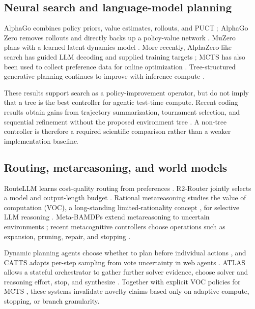 \documentclass[10pt,twocolumn]{article}
\begin{document}
\subsection{Neural search and language-model planning}

AlphaGo combines policy priors, value estimates, rollouts, and PUCT
\citep{silver2016alphago}; AlphaGo Zero removes rollouts and directly backs up a
policy-value network \citep{silver2017zero}. MuZero plans with a learned latent
dynamics model \citep{schrittwieser2020muzero}. More recently, AlphaZero-like
search has guided LLM decoding and supplied training targets
\citep{feng2024tsllm}; MCTS has also been used to collect preference data for
online optimization \citep{xu2025mctsep}. Tree-structured generative planning
continues to improve with inference compute \citep{yoon2025mctd}.

These results support search as a policy-improvement operator, but do not imply
that a tree is the best controller for agentic test-time compute. Recent coding
results obtain gains from trajectory summarization, tournament selection, and
sequential refinement without the proposed environment tree
\citep{kim2026coding}. A non-tree controller is therefore a required scientific
comparison rather than a weaker implementation baseline.

\subsection{Routing, metareasoning, and world models}

RouteLLM learns cost-quality routing from preferences
\citep{ong2025routellm}. R2-Router jointly selects a model and output-length
budget \citep{xue2026r2router}. Rational metareasoning studies the value of
computation (VOC), a long-standing limited-rationality concept
\citep{russell1991right}, for selective LLM reasoning
\citep{desabbata2025metareasoning}. Meta-BAMDPs extend metareasoning to
uncertain environments \citep{godara2026metabamdp}; recent metacognitive
controllers choose operations such as expansion, pruning, repair, and stopping
\citep{ma2026cot2meta}.

Dynamic planning agents choose whether to plan before individual actions
\citep{paglieri2025whenplan}, and CATTS adapts per-step sampling from vote
uncertainty in web agents \citep{lee2026catts}. ATLAS allows a stateful
orchestrator to gather further solver evidence, choose solver and reasoning
effort, stop, and synthesize \citep{qin2026atlas}. Together with explicit VOC
policies for MCTS \citep{sezener2020voc}, these systems invalidate novelty
claims based only on adaptive compute, stopping, or branch granularity.
\end{document}
